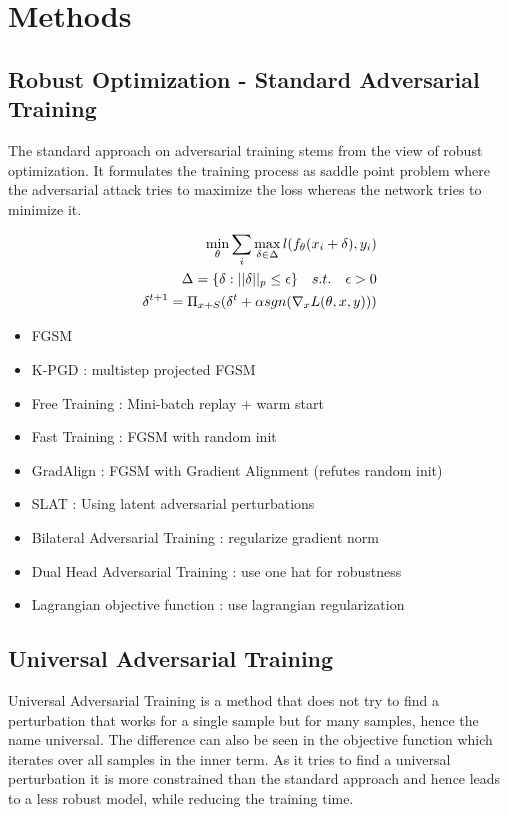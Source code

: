 \documentclass[conference]{IEEEtran}
\begin{document}
\section{Methods}

\subsection{Robust Optimization - Standard Adversarial Training} \cite{b2}
The standard approach on adversarial training stems from the view of robust optimization. It formulates the training process as saddle point problem where the adversarial attack tries to maximize the loss whereas the network tries to minimize it.

\begin{align*}
  \min_{\theta} \sum_i \max_{\delta \in \Delta} \space l(f_{\theta}(x_i + \delta), y_i)  \\
\Delta = \{\delta : ||\delta||_p \leq \epsilon\} \quad s.t. \quad \epsilon > 0 \\
\delta^{t+1} = \Pi_{x+S} (\delta^t + \alpha sgn(\nabla_x L(\theta,x,y)))
\end{align*}

\begin{itemize}
  \item FGSM \cite{b9}
  \item K-PGD \cite{b2}: multistep projected FGSM
  \item Free Training \cite{b5}: Mini-batch replay + warm start
  \item Fast Training \cite{b3}: FGSM with random init
  \item GradAlign \cite{b7}: FGSM with Gradient Alignment (refutes random init)
  \item SLAT \cite{b26}: Using latent adversarial perturbations
  \item Bilateral Adversarial Training \cite{b8}: regularize gradient norm
  \item Dual Head Adversarial Training \cite{b24}: use one hat for robustness
  \item Lagrangian objective function \cite{b25}: use lagrangian regularization
\end{itemize}


\subsection{Universal Adversarial Training} \cite{b4}
Universal Adversarial Training is a method that does not try to find a perturbation that works for a single sample but for many samples, hence the name universal. The difference can also be seen in the objective function which iterates over all samples in the inner term. As it tries to find a universal perturbation it is more constrained than the standard approach and hence leads to a less robust model, while reducing the training time.
\end{document}
